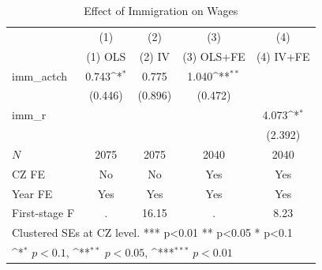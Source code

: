 \begin{table}[htbp]\centering
\def\sym#1{\ifmmode^{#1}\else\(^{#1}\)\fi}
\caption{Effect of Immigration on Wages}
\begin{tabular}{l*{4}{c}}
\hline\hline
            &\multicolumn{1}{c}{(1)}&\multicolumn{1}{c}{(2)}&\multicolumn{1}{c}{(3)}&\multicolumn{1}{c}{(4)}\\
            &\multicolumn{1}{c}{(1) OLS}&\multicolumn{1}{c}{(2) IV}&\multicolumn{1}{c}{(3) OLS+FE}&\multicolumn{1}{c}{(4) IV+FE}\\
\hline
imm\_actch   &       0.743\sym{*}  &       0.775         &       1.040\sym{**} &                     \\
            &     (0.446)         &     (0.896)         &     (0.472)         &                     \\
[1em]
imm\_r       &                     &                     &                     &       4.073\sym{*}  \\
            &                     &                     &                     &     (2.392)         \\
\hline
\(N\)       &        2075         &        2075         &        2040         &        2040         \\
CZ FE       &          No         &          No         &         Yes         &         Yes         \\
Year FE     &         Yes         &         Yes         &         Yes         &         Yes         \\
First-stage F&           .         &       16.15         &           .         &        8.23         \\
\hline\hline
\multicolumn{5}{l}{\footnotesize Clustered SEs at CZ level. *** p<0.01 ** p<0.05 * p<0.1}\\
\multicolumn{5}{l}{\footnotesize \sym{*} \(p<0.1\), \sym{**} \(p<0.05\), \sym{***} \(p<0.01\)}\\
\end{tabular}
\end{table}
